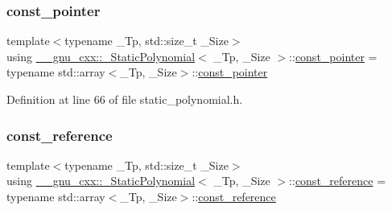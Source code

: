 \mbox{\label{class____gnu__cxx_1_1__StaticPolynomial_aca8a01882c3f641029a27d77ff1afc5d}} 
\subsubsection{\texorpdfstring{const\+\_\+pointer}{const\_pointer}}
{\footnotesize\ttfamily template$<$typename \+\_\+\+Tp, std\+::size\+\_\+t \+\_\+\+Size$>$ \\
using \hyperlink{class____gnu__cxx_1_1__StaticPolynomial}{\+\_\+\+\_\+gnu\+\_\+cxx\+::\+\_\+\+Static\+Polynomial}$<$ \+\_\+\+Tp, \+\_\+\+Size $>$\+::\hyperlink{class____gnu__cxx_1_1__StaticPolynomial_aca8a01882c3f641029a27d77ff1afc5d}{const\+\_\+pointer} =  typename std\+::array$<$\+\_\+\+Tp, \+\_\+\+Size$>$\+::\hyperlink{class____gnu__cxx_1_1__StaticPolynomial_aca8a01882c3f641029a27d77ff1afc5d}{const\+\_\+pointer}}



Definition at line 66 of file static\+\_\+polynomial.\+h.

\mbox{\label{class____gnu__cxx_1_1__StaticPolynomial_a5beadf45736ad37f2cb46e06050d9ee9}} 
\subsubsection{\texorpdfstring{const\+\_\+reference}{const\_reference}}
{\footnotesize\ttfamily template$<$typename \+\_\+\+Tp, std\+::size\+\_\+t \+\_\+\+Size$>$ \\
using \hyperlink{class____gnu__cxx_1_1__StaticPolynomial}{\+\_\+\+\_\+gnu\+\_\+cxx\+::\+\_\+\+Static\+Polynomial}$<$ \+\_\+\+Tp, \+\_\+\+Size $>$\+::\hyperlink{class____gnu__cxx_1_1__StaticPolynomial_a5beadf45736ad37f2cb46e06050d9ee9}{const\+\_\+reference} =  typename std\+::array$<$\+\_\+\+Tp, \+\_\+\+Size$>$\+::\hyperlink{class____gnu__cxx_1_1__StaticPolynomial_a5beadf45736ad37f2cb46e06050d9ee9}{const\+\_\+reference}}



